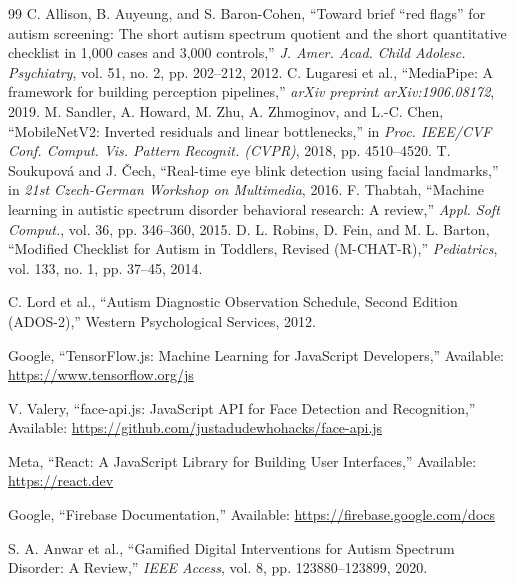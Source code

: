 \documentclass[12pt,a4paper]{report}
\begin{document}
\renewcommand{\bibname}{REFERENCES}
\begin{thebibliography}{99}
     C. Allison, B. Auyeung, and S. Baron-Cohen, ``Toward brief ``red flags'' for autism screening: The short autism spectrum quotient and the short quantitative checklist in 1,000 cases and 3,000 controls,'' \textit{J. Amer. Acad. Child Adolesc. Psychiatry}, vol. 51, no. 2, pp. 202--212, 2012.
     C. Lugaresi et al., ``MediaPipe: A framework for building perception pipelines,'' \textit{arXiv preprint arXiv:1906.08172}, 2019.
     M. Sandler, A. Howard, M. Zhu, A. Zhmoginov, and L.-C. Chen, ``MobileNetV2: Inverted residuals and linear bottlenecks,'' in \textit{Proc. IEEE/CVF Conf. Comput. Vis. Pattern Recognit. (CVPR)}, 2018, pp. 4510--4520.
     T. Soukupov\'a and J. \v{C}ech, ``Real-time eye blink detection using facial landmarks,'' in \textit{21st Czech-German Workshop on Multimedia}, 2016.
     F. Thabtah, ``Machine learning in autistic spectrum disorder behavioral research: A review,'' \textit{Appl. Soft Comput.}, vol. 36, pp. 346--360, 2015.
     D. L. Robins, D. Fein, and M. L. Barton, 
``Modified Checklist for Autism in Toddlers, Revised (M-CHAT-R),'' 
\textit{Pediatrics}, vol. 133, no. 1, pp. 37--45, 2014.

 C. Lord et al., 
``Autism Diagnostic Observation Schedule, Second Edition (ADOS-2),'' 
Western Psychological Services, 2012.

 Google, 
``TensorFlow.js: Machine Learning for JavaScript Developers,'' 
Available: \url{https://www.tensorflow.org/js}

 V. Valery, 
``face-api.js: JavaScript API for Face Detection and Recognition,'' 
Available: \url{https://github.com/justadudewhohacks/face-api.js}

 Meta, 
``React: A JavaScript Library for Building User Interfaces,'' 
Available: \url{https://react.dev}

 Google, 
``Firebase Documentation,'' 
Available: \url{https://firebase.google.com/docs}

 S. A. Anwar et al., 
``Gamified Digital Interventions for Autism Spectrum Disorder: A Review,'' 
\textit{IEEE Access}, vol. 8, pp. 123880--123899, 2020.
\end{thebibliography}
\end{document}
